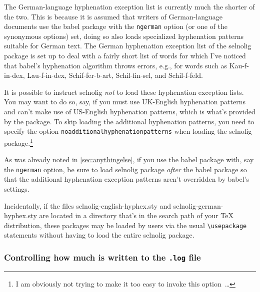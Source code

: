 \documentclass[12pt]{article}
\newcommand{\pkg}[1]{\textsf{#1}}
\newcommand{\opt}[1]{\texttt{#1}}
\newcommand{\cmmd}[1]{\texttt{\textbackslash #1}}
\begin{document}
The German-language hyphenation exception list is currently much the shorter of the two. This is because it is assumed that writers of German-language documents use the \pkg{babel} package with the \opt{ngerman} option (or one of the synonymous options) set, doing so also loads specialized hyphenation patterns suitable for German text. The German hyphenation exception list of the \pkg{selnolig} package is set up to deal with a fairly short list of words for which I've noticed that \pkg{babel}'s hyphenation algorithm throws errors, e.g., for words such as Kau-f-in-dex, Lau-f-in-dex, Schif-fer-b-art, Schil-fin-sel, and Schil-f-feld.

It is possible to instruct \pkg{selnolig} \emph{not} to load these hyphenation exception lists. You may want to do so, say, if you must use UK-English hyphenation patterns and can't make use of US-English hyphenation patterns, which is what's provided by the package. To skip loading the additional hyphenation patterns, you need to specify the option \opt{noadditional\-hyphen\-a\-tion\-patterns} when loading the \pkg{selnolig} package.\footnote{I am obviously not trying to make it too easy to invoke this option~\dots}

As was already noted in \cref{sec:anythingelse}, if you use the \pkg{babel} package with, say the \opt{ngerman} option, be sure to load \pkg{selnolig} package \emph{after} the babel package so that the additional hyphenation exception patterns aren't overridden by \pkg{babel}'s settings.

Incidentally, if the files \pkg{selnolig-english-hyphex.sty} and \pkg{selnolig-german-hyphex.sty} are located in a directory that's in the search path of your TeX distribution, these packages may be loaded by users via the usual \cmmd{usepackage} statements without having to load the entire \pkg{selnolig} package.


\subsubsection[Controlling how much is written to the .log file]{Controlling how much is written to the \opt{.log} file}
\end{document}
